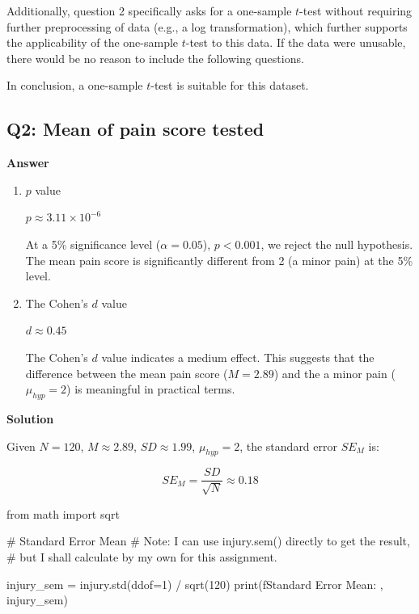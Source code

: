 \documentclass[
  a4paper,
  DIV=11,
  numbers=noendperiod]{scrartcl}
\newenvironment{Shaded}{\begin{snugshade}}{\end{snugshade}}
\newcommand{\BuiltInTok}[1]{\textcolor[rgb]{0.00,0.23,0.31}{#1}}
\newcommand{\CommentTok}[1]{\textcolor[rgb]{0.37,0.37,0.37}{#1}}
\newcommand{\DecValTok}[1]{\textcolor[rgb]{0.68,0.00,0.00}{#1}}
\newcommand{\ImportTok}[1]{\textcolor[rgb]{0.00,0.46,0.62}{#1}}
\newcommand{\NormalTok}[1]{\textcolor[rgb]{0.00,0.23,0.31}{#1}}
\newcommand{\OperatorTok}[1]{\textcolor[rgb]{0.37,0.37,0.37}{#1}}
\newcommand{\SpecialStringTok}[1]{\textcolor[rgb]{0.13,0.47,0.30}{#1}}
\begin{document}
Additionally, question 2 specifically asks for a one-sample \(t\)-test
without requiring further preprocessing of data (e.g., a log
transformation), which further supports the applicability of the
one-sample \(t\)-test to this data. If the data were unusable, there
would be no reason to include the following questions.

In conclusion, a one-sample \(t\)-test is suitable for this dataset.

\subsection{Q2: Mean of pain score
tested}\label{q2-mean-of-pain-score-tested}

\textbf{Answer}

\begin{enumerate}
\def\labelenumi{\arabic{enumi}.}
\item
  \(p\) value

  \(p \approx 3.11 \times 10^{-6}\)

  At a 5\% significance level (\(\alpha = 0.05\)), \(p < 0.001\), we
  reject the null hypothesis. The mean pain score is significantly
  different from 2 (a minor pain) at the 5\% level.
\item
  The Cohen's \(d\) value

  \(d \approx 0.45\)

  The Cohen's \(d\) value indicates a medium effect. This suggests that
  the difference between the mean pain score (\(M = 2.89\)) and the a
  minor pain (\(\mu_{hyp} = 2\)) is meaningful in practical terms.
\end{enumerate}

\textbf{Solution}

Given \(N = 120\), \(M \approx 2.89\), \(SD \approx 1.99\),
\(\mu_{hyp} = 2\), the standard error \(SE_M\) is:

\[
SE_M = \frac{SD}{\sqrt{N}} \approx 0.18
\]

\begin{Shaded}
\begin{Highlighting}[numbers=left,,]
\ImportTok{from}\NormalTok{ math }\ImportTok{import}\NormalTok{ sqrt}

\CommentTok{\# Standard Error Mean}
\CommentTok{\# Note: I can use injury.sem() directly to get the result, }
\CommentTok{\# but I shall calculate by my own for this assignment. }

\NormalTok{injury\_sem }\OperatorTok{=}\NormalTok{ injury.std(ddof}\OperatorTok{=}\DecValTok{1}\NormalTok{) }\OperatorTok{/}\NormalTok{ sqrt(}\DecValTok{120}\NormalTok{)}
\BuiltInTok{print}\NormalTok{(}\SpecialStringTok{f\textquotesingle{}Standard Error Mean: \textquotesingle{}}\NormalTok{, injury\_sem)}
\end{Highlighting}
\end{Shaded}
\end{document}
